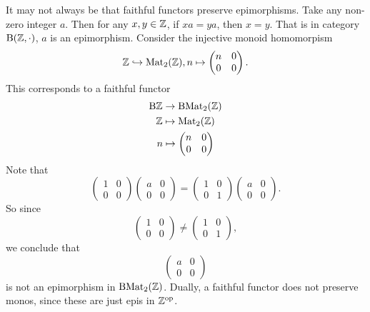     \begin{example}
        It may not always be that faithful functors preserve epimorphisms. Take any non-zero integer $a$. Then for any $x,y\in\mathbb{Z}$, if $xa = ya$, then $x=y$. That is in category $\mathrm{B}(\mathbb{Z},\cdot)$, $a$ is an epimorphism. Consider the injective monoid homomorpism 
        $$
        \mathbb{Z} \hookrightarrow \mathrm{Mat}_2(\mathbb{Z}), n \mapsto \begin{pmatrix}
            n & 0 \\
            0 & 0
        \end{pmatrix}.
        $$
        This corresponds to a faithful functor 
        \begin{gather*}
            \mathrm{B}\mathbb{Z} \rightarrow \mathrm{B}\mathrm{Mat}_2(\mathbb{Z})\\
            \mathbb{Z} \mapsto \mathrm{Mat}_2(\mathbb{Z})\\
            n \mapsto \begin{pmatrix}
            n & 0 \\
            0 & 0
        \end{pmatrix}
        \end{gather*}
        Note that 
        $$
            \begin{pmatrix}
                1 & 0 \\
                0 & 0
            \end{pmatrix}
            \begin{pmatrix}
                a & 0\\
                0 & 0  
            \end{pmatrix}
            = 
            \begin{pmatrix}
                1 & 0\\
                0 & 1
            \end{pmatrix}
            \begin{pmatrix}
                a & 0\\
                0 & 0  
            \end{pmatrix}.
        $$
        So since 
        $$
            \begin{pmatrix}
                1 & 0 \\
                0 & 0
            \end{pmatrix} 
            \neq
            \begin{pmatrix}
                1 & 0\\
                0 & 1
            \end{pmatrix},
        $$
        we conclude that 
        $$
            \begin{pmatrix}
                a & 0\\
                0 & 0
            \end{pmatrix}
        $$
        is not an epimorphism in $\mathrm{B}\mathrm{Mat}_2(\mathbb{Z})$. Dually, a faithful functor does not preserve monos, since these are just epis in $\mathbb{Z}^\mathrm{op}$.
    \end{example}
